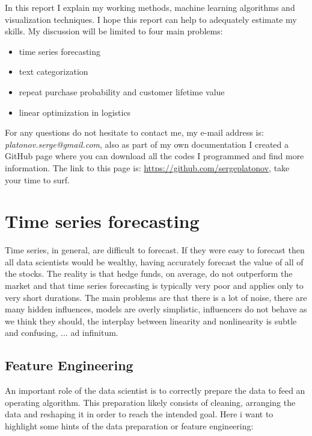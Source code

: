 \documentclass[11pt,fleqn]{book} %
\begin{document}
In this report I explain my working methods, machine learning algorithms and visualization techniques. I hope this report can help to adequately estimate my skills. My discussion will be limited to four main problems: 

\begin{itemize}
\item time series forecasting 
\item text categorization 
\item repeat purchase probability and customer lifetime value
\item linear optimization in logistics
\end{itemize}

\begin{remark}
 For any questions do not hesitate to contact me, my e-mail address is: \emph{platonov.serge@gmail.com}, also as part of my own documentation I created a GitHub page where you can download all the codes I programmed and find more information. The link to this page is: \url{https://github.com/sergeplatonov}, take your time to surf.
\end{remark}

\chapter{Time series forecasting}

Time series, in general, are difficult to forecast. If they were easy to forecast then all data scientists would be wealthy, having accurately forecast the value of all of the stocks. The reality is that hedge funds, on average, do not outperform the market and that time series forecasting is typically very poor and applies only to very short durations. The main problems are that there is a lot of noise, there are many hidden influences, models are overly simplistic, influencers do not behave as we think they should, the interplay between linearity and nonlinearity is subtle and confusing, ... ad infinitum.

\section{Feature Engineering}

An important role of the data scientist is to correctly prepare the data to feed an operating algorithm. This preparation likely consists of cleaning, arranging the data and reshaping it in order to reach the intended goal. Here i want to highlight some hints of the data preparation or feature engineering:
\end{document}

